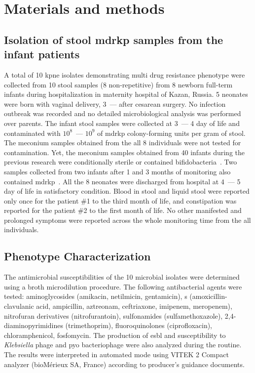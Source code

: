 \section{Materials and methods}\label{sec:mat_met}
\subsection{Isolation of stool \gls{mdrkp} samples from the infant patients}\label{subsec:iso}
A total of 10 \gls{kpne} isolates demonstrating multi drug resistance phenotype were collected from
10 stool samples (8 non-repetitive) from 8 newborn full-term infants during hospitalization in
maternity hospital of Kazan, Russia.
5 neonates were born with vaginal delivery, 3~--- after cesarean surgery.
No infection outbreak was recorded and no detailed microbiological analysis was performed over parents.
The infant stool samples were collected at 3~--- 4 day of life and contaminated with $10^8$~--- $10^9$ of \gls{mdrkp}
colony-forming units per gram of stool.
The meconium samples obtained from the all 8 individuals were not tested for contamination.
Yet, the meconium samples obtained from 40 infants during the previous research were conditionally sterile or
contained bifidobacteria~\cite{Nikolaeva2019a}.
Two samples collected from two infants after 1 and 3 months of monitoring also contained \gls{mdrkp}~.
All the 8 neonates were discharged from hospital at 4~--- 5 day of life in satisfactory condition.
Blood in stool and liquid stool were reported only once for the patient \#1 to the third month of life,
and constipation was reported for the patient \#2 to the first month of life.
No other manifested and prolonged symptoms were reported across the whole monitoring time from the all individuals.

\subsection{Phenotype Characterization}\label{subsec:phe}
The antimicrobial susceptibilities of the 10 microbial isolates were determined using a broth microdilution procedure.
The following antibacterial agents were tested: aminoglycosides (amikacin, netilmicin, gentamicin),
\betalactam s (amoxicillin-clavulanic acid, ampicillin, aztreonam, ceftriaxone, imipenem, meropenem),
nitrofuran derivatives (nitrofurantoin), sulfonamides (sulfamethoxazole), 2,4-diaminopyrimidines (trimethoprim),
fluoroquinolones (ciprofloxacin), chloramphenicol, fosfomycin.
The production of \gls{esbl} and susceptibility to \textit{Klebsiella} phage and pyo bacteriophage
were also analyzed during the routine.
The results were interpreted in automated mode using VITEK 2 Compact analyzer (bioMérieux SA, France) according to
producer's guidance documents.

